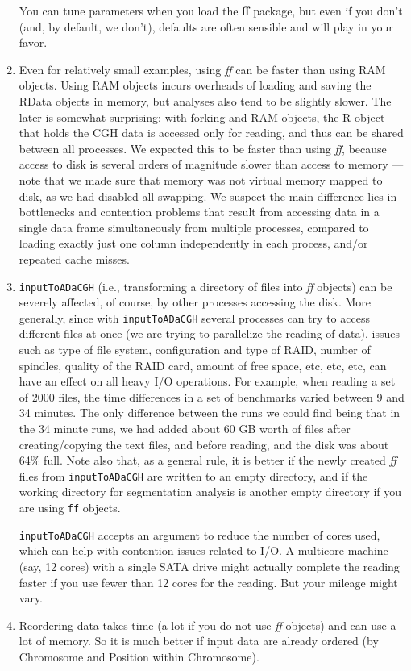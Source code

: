 \documentclass[a4paper,11pt]{article}
\begin{document}
\begin{enumerate}
  You can tune parameters when you load the \textbf{ff} package, but even
  if you don't (and, by default, we don't), defaults are often sensible
  and will play in your favor.
  
\item Even for relatively small examples, using \textit{ff} can be faster
  than using RAM objects. Using RAM objects incurs overheads of loading
  and saving the RData objects in memory, but analyses also tend to be
  slightly slower. The later is somewhat surprising: with forking and RAM
  objects, the R object that holds the CGH data is accessed only for
  reading, and thus can be shared between all processes. We expected this
  to be faster than using \textit{ff}, because access to disk is several
  orders of magnitude slower than access to memory ---note that we made
  sure that memory was not virtual memory mapped to disk, as we had
  disabled all swapping. We suspect the main difference lies in
  bottlenecks and contention problems that result from accessing data in a
  single data frame simultaneously from multiple processes, compared to
  loading exactly just one column independently in each process, and/or
  repeated cache misses.
  
  
\item \texttt{inputToADaCGH} (i.e., transforming a directory of files into
  \textit{ff} objects) can be severely affected, of course, by other
  processes accessing the disk. More generally, since with
  \texttt{inputToADaCGH} several processes can try to access different
  files at once (we are trying to parallelize the reading of data), issues
  such as type of file system, configuration and type of RAID, number of
  spindles, quality of the RAID card, amount of free space, etc, etc, etc,
  can have an effect on all heavy I/O operations.  For example, when
  reading a set of 2000 files, the time differences in a set of benchmarks
  varied between 9 and 34 minutes. The only difference between the runs we
  could find being that in the 34 minute runs, we had added about 60 GB
  worth of files after creating/copying the text files, and before
  reading, and the disk was about 64\% full. Note also that, as a general
  rule, it is better if the newly created \textit{ff} files from
  \texttt{inputToADaCGH} are written to an empty directory, and if the
  working directory for segmentation analysis is another empty directory
  if you are using \texttt{ff} objects.

  
  \texttt{inputToADaCGH} accepts an argument to reduce the number of cores used,
  which can help with contention issues related to I/O. A multicore
  machine (say, 12 cores) with a single SATA drive might actually
  complete the reading faster if you use fewer than 12 cores for the
  reading. But your mileage might vary.
  
  
\item Reordering data takes time (a lot if you do not use \textit{ff}
  objects) and can use a lot of memory. So it is much better if input data are
  already ordered (by Chromosome and Position within Chromosome).
  
\end{enumerate}



\newpage

\end{document}
